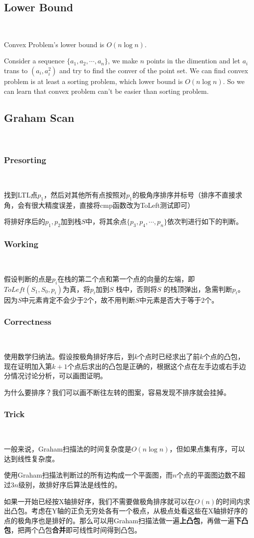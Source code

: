 \documentclass[12pt]{article}
\begin{document}
\begin{CJK*}{GBK}{song}
        \subsection{Lower Bound}\
            \par Convex Problem's lower bound is $O(n\log n)$.
            \par Consider a sequence $\{a_1,a_2,\cdots, a_n\}$, we make $n$ points in the dimention and let $a_i$ trans to $(a_i,a_i^2)$ and try to find the conver of the point set. We can find convex problem is at least a sorting problem, which lower bound is $O(n\log n)$. So we can learn that convex problem can't be easier than sorting problem.
        \subsection{Graham Scan}\
            \subsubsection{Presorting}\
                \par 找到LTL点$p_1$，然后对其他所有点按照对$p_1$的极角序排序并标号（排序不直接求角，会有很大精度误差，直接将cmp函数改为ToLeft测试即可）
                \par 将排好序后的$p_1,p_2$加到栈$S$中，将其余点$\{p_3,p_4,\cdots,p_n\}$依次判进行如下的判断。
            \subsubsection{Working}\
                \par 假设判断的点是$p_i$在栈的第二个点和第一个点的向量的左端，即$ToLeft(S_1,S_0,p_i)$为真，将$p_i$加到$S$ 栈中，否则将$S$ 的栈顶弹出，急需判断$p_i$。因为$S$中元素肯定不会少于$2$个，故不用判断$S$中元素是否大于等于$2$个。
            \subsubsection{Correctness}\
                \par 使用数学归纳法。假设按极角排好序后，到$k$个点时已经求出了前$k$个点的凸包，现在证明加入第$k+1$个点后求出的凸包是正确的，根据这个点在左手边或右手边分情况讨论分析，可以画图证明。
                \par 为什么要排序？我们可以画不断往左转的图案，容易发现不排序就会挂掉。
            \subsubsection{Trick}\
                \par 一般来说，Graham扫描法的时间复杂度是$O(n\log n)$，但如果点集有序，可以达到线性复杂度。
                \par 使用Graham扫描法判断过的所有边构成一个平面图，而$n$个点的平面图边数不超过$3n$级别，故排好序后算法是线性的。
                \par 如果一开始已经按X轴排好序，我们不需要做极角排序就可以在$O(n)$的时间内求出凸包。考虑在Y轴的正负无穷处各有一个极点，从极点处看这些在X轴排好序的点的极角序也是排好的。那么可以用Graham扫描法做一遍\textbf{上凸包}，再做一遍\textbf{下凸包}，把两个凸包\textbf{合并}即可线性时间得到凸包。

\end{CJK*}
\end{document}
